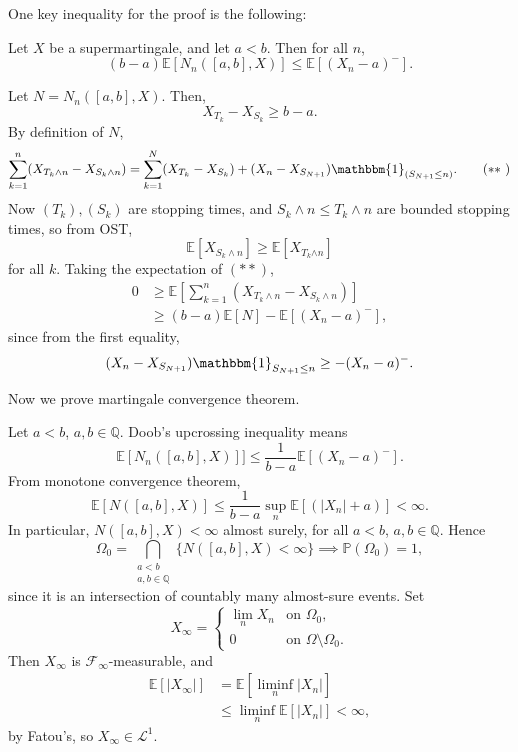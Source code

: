 \documentclass[12pt]{article}
\begin{document}
One key inequality for the proof is the following:

\begin{theorem}
	Let $X$ be a supermartingale, and let $a < b$. Then for all $n$,
	\[
		(b - a) \mathbb{E}[N_n([a, b], X)] \leq \mathbb{E}[(X_n - a)^{-}].
	\]
\end{theorem}

\begin{proofbox}
	Let $N = N_n([a, b], X)$. Then,
	\[
		X_{T_k} - X_{S_k} \geq b - a.
	\]
	By definition of $N$,
	\[
	\sum_{k=1}^n (X_{T_{k}{\wedge n}} - X_{S_{k}{ \wedge n}}) = \sum_{k = 1}^N(X_{T_k} - X_{S_k}) + (X_n - X_{S_{N+1}}) \mathbbm{1}_{(S_{N+1} \leq n)}. \tag{$\ast\ast$ }
	\]
	Now $(T_k), (S_k)$ are stopping times, and $S_k \wedge n \leq T_{k} \wedge n$ are bounded stopping times, so from OST,
	\[
	\mathbb{E}[X_{S_{k}\wedge n}] \geq \mathbb{E}[X_{T_{k} {\wedge n}}]
	\]
	for all $k$. Taking the expectation of $(\ast\ast)$,
	\begin{align*}
		0 &\geq \mathbb{E}\left[ \sum_{k = 1}^n (X_{T_k \wedge n} - X_{S_k \wedge n}) \right] \\
		&\geq (b - a)\mathbb{E}[N] - \mathbb{E}[(X_n - a)^{-}],
	\end{align*}
	since from the first equality,
	\[
		(X_n - X_{S_{N+1}})\mathbbm{1}_{S_{N+1} \leq n} \geq - (X_n - a)^{-}.
	\]
\end{proofbox}

Now we prove martingale convergence theorem.

\begin{proofbox}
	Let $a < b$, $a, b \in \mathbb{Q}$. Doob's upcrossing inequality means
	\[
		\mathbb{E}[N_n([a, b], X)]] \leq \frac{1}{b-a} \mathbb{E}[(X_n-a)^{-}].
	\]
	From monotone convergence theorem,
	\[
		\mathbb{E}[N([a, b],X)] \leq \frac{1}{b - a} \sup_n \mathbb{E}[(|X_n| + a)] < \infty.
	\]
	In particular, $N([a, b], X) < \infty$ almost surely, for all $a < b$, $a, b\in \mathbb{Q}$. Hence
	\[
		\Omega_0 = \bigcap_{\substack{a < b\\a, b \in \mathbb{Q}}} \{N([a, b], X) < \infty\} \implies \mathbb{P}(\Omega_0) = 1,
	\]
	since it is an intersection of countably many almost-sure events. Set
	\[
	X_\infty =
	\begin{cases}
		\lim_n X_n & \text{on } \Omega_0,\\
		0 &\text{on } \Omega\setminus \Omega_0.
	\end{cases}
	\]
	Then $X_\infty$ is $\mathcal{F}_\infty$-measurable, and
	\begin{align*}
		\mathbb{E}[|X_\infty|] &= \mathbb{E}[\liminf_n |X_n|] \\
				       &\leq \liminf_n \mathbb{E}[|X_n|] < \infty,
	\end{align*}
	by Fatou's, so $X_\infty \in \mathcal{L}^1$.
\end{proofbox}
\end{document}
